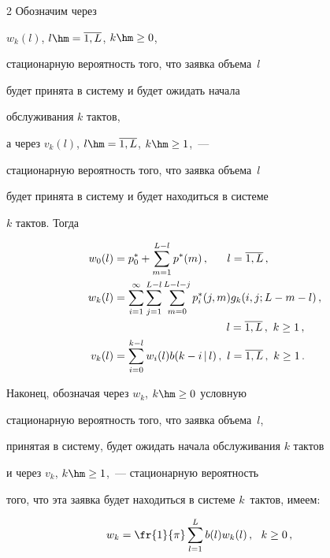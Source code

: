 \begin{multicols}{2}
Обозначим через


$w_k(l)$, $l\hm= \overline{1,L}$, $k\hm\ge 0$,


стационарную вероятность того, что заявка объема~$l$


будет принята в систему и будет ожидать начала


обслуживания $k$ тактов,


а через $v_k(l)$, $l\hm= \overline{1,L}$, $k\hm\ge 1$,~---


стационарную вероятность того, что заявка объема~$l$


будет принята в систему и будет находиться в сис\-те\-ме


$k$ тактов. Тогда


\begin{align*}


w_0(l) &= p^*_0 + \sum\limits_{m=1}^{L-l} p^*(m)\,,\quad\ \ l= \overline{1,L}\,,


\\


w_k(l) &= \sum_{i=1}^{\infty} \sum\limits_{j=1}^{L-l} \sum\limits_{m=0}^{L-l-j} p^*_{i}(j,m) 


g_{k}(i,j;L-m-l)\,,\\


&\hspace*{36mm}  l= \overline{1,L}\,,\  k\ge 1\,,


\\


v_k(l) &= \sum\limits_{i=0}^{k-l} w_i(l) b(k-i\,|\,l) \,,\  l= \overline{1,L}\,,\  k\ge 1\,.


\end{align*}







Наконец, обозначая через $w_k$, $k\hm\ge 0$ условную


стационарную вероятность того, что заявка объема~$l$,


принятая в сис\-те\-му, будет ожидать начала обслуживания $k$ тактов


и через $v_k$, $k\hm\ge 1$,~--- стационарную вероятность


того, что эта заявка будет находиться в сис\-те\-ме $k$~тактов, имеем:


\begin{align*}


w_k&= \fr{1}{\pi} \sum\limits_{l=1}^{L} b(l) w_{k}(l) \,,\ \ k\ge 0\,,



\end{align*}
\end{multicols}
